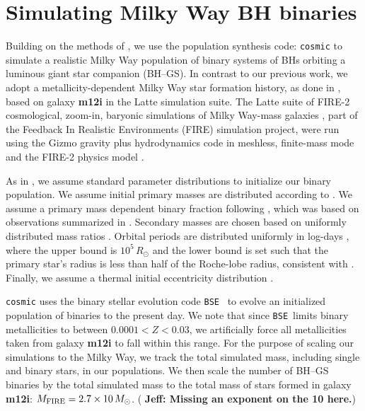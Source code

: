 \documentclass[twocolumn,tighten]{aastex61}
\newcommand{\msun}{{M_\odot}}
\newcommand{\rsun}{{R_\odot}}
\newcommand{\cosmic}{{\texttt{cosmic} }}
\newcommand{\bse}{\texttt{BSE}}
\newcommand{\jeff}[1]{\textbf{\color{teal} Jeff: #1}}
\begin{document}
%
\section{Simulating Milky Way BH binaries}
\label{S:methods}

Building on the methods of \cite{Breivik2017_gaia}, we use the population synthesis code: \cosmic to  simulate a realistic Milky Way population of binary systems of BHs orbiting a luminous giant star companion (BH--GS). In contrast to our previous work, we adopt a metallicity-dependent Milky Way star formation history, as done in \cite{Lamberts2018},  based on galaxy {\bf{m12i}} in the Latte simulation suite. The Latte suite of FIRE-2 cosmological, zoom-in, baryonic simulations of Milky Way-mass galaxies \citep{Wetzel2016}, part of the Feedback In Realistic Environments (FIRE) simulation project, were run using the Gizmo gravity plus hydrodynamics code in meshless, finite-mass mode \citep{Hopkins2015} and the FIRE-2 physics model \citep{Hopkins2018}. 

As in \cite{Breivik2017_gaia}, we assume standard parameter distributions to initialize our binary population. We assume initial primary masses are distributed according to \citet{Kroupa2001}. We assume a primary mass dependent binary fraction following \citet{vanHaaften2013}, which was based on observations summarized in \citet{Kouwenhoven2009, Kraus2009, Sana2012}. Secondary masses are chosen based on uniformly distributed mass ratios \citep{Mazeh1992, Goldberg1994}. Orbital periods are distributed uniformly in log-days \citep{Abt1983}, where the upper bound is $10^5\,\rsun$ and the lower bound is set such that the primary star's radius is less than half of the Roche-lobe radius, consistent with \cite{Dominik2012, Dominik2013}. Finally, we assume a thermal initial eccentricity distribution \citep{Heggie1975}. 

\cosmic uses the binary stellar evolution code \bse\ \citep{Hurley2002} to evolve an initialized population of binaries to the present day. We note that since \bse\ limits binary metallicities to between $0.0001 < Z < 0.03$, we artificially force all metallicities taken from galaxy {\bf{m12i}} to fall within this range. For the purpose of scaling our simulations to the Milky Way, we track the total simulated mass, including single and binary stars, in our populations. We then scale the number of BH--GS binaries by the total simulated mass to the total mass of stars formed in galaxy {\bf{m12i}}: $M_{\rm{FIRE}}=2.7\times10\,\msun$. (\jeff{Missing an exponent on the 10 here.})
\end{document}

